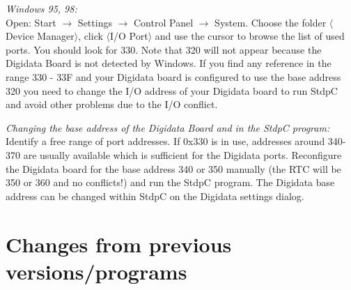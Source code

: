 \documentclass{article}
\begin{document}
\noindent
{\em Windows 95, 98: } \\ Open: Start $\rightarrow$ Settings
$\rightarrow$ Control Panel $\rightarrow$ System. Choose the folder
$\langle$Device Manager$\rangle$, click $\langle$I/O Port$\rangle$ and
use the cursor to browse the list of used ports. You should look for
330.  Note that 320 will not appear because the Digidata Board is not
detected by Windows. If you find any reference in the range 330 - 33F
and your Digidata board is configured to use the base address 320 you
need to change the I/O address of your Digidata board to run StdpC
and avoid other problems due to the I/O conflict.
 
\noindent
{\em Changing the base address of the Digidata Board and in the StdpC
  program: } \\ Identify a free range of port addresses.  If 0x330 is
in use, addresses around 340-370 are usually available which is
sufficient for the Digidata ports. Reconfigure the Digidata
board for the base address 340 or 350 manually (the RTC will be 350 or
360 and no conflicts!) and run the StdpC program. The Digidata base
address can be changed within StdpC on the Digidata settings dialog.

\section{Changes from previous versions/programs}
\end{document}
